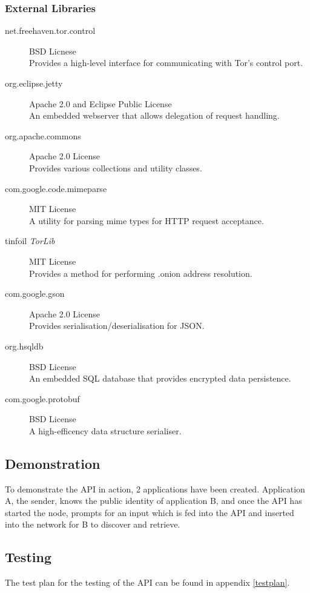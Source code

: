 		\subsubsection*{External Libraries}
			\begin{description}
				\item[net.freehaven.tor.control] BSD Licnese \\
					Provides a high-level interface for communicating with Tor's control port.
				\item[org.eclipse.jetty] Apache 2.0 and Eclipse Public License \\
					An embedded webserver that allows delegation of request handling.
				\item[org.apache.commons] Apache 2.0 License \\
					Provides various collections and utility classes.
				\item[com.google.code.mimeparse] MIT License \\
					A utility for parsing mime types for HTTP request acceptance.
				\item[tinfoil \textit{TorLib}] MIT License \\
					Provides a method for performing .onion address resolution.
				\item[com.google.gson] Apache 2.0 License \\
					Provides serialisation/deserialisation for JSON.
				\item[org.hsqldb] BSD License \\
					An embedded SQL database that provides encrypted data persistence.
				\item[com.google.protobuf] BSD License \\
					A high-efficency data structure serialiser.
			\end{description}
	\subsection{Demonstration}
		To demonstrate the API in action, 2 applications have been created. Application A, the sender, knows the public identity of application B, and once the API has started the node, prompts for an input which is fed into the API and inserted into the network for B to discover and retrieve.
	\subsection{Testing}
		The test plan for the testing of the API can be found in appendix \ref{testplan}.

